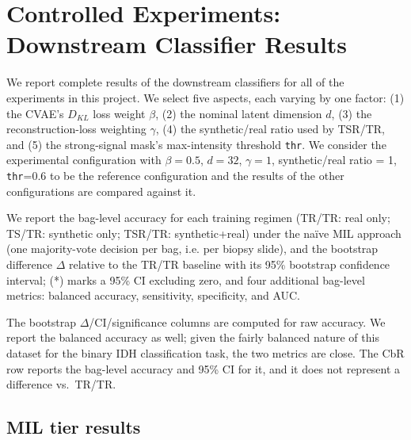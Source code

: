 \section{Controlled Experiments: Downstream Classifier Results}
\label{app:controlled_experiments}
\setcounter{table}{0}
\renewcommand{\thetable}{\Alph{section}.\arabic{table}}
\setcounter{figure}{0}
\renewcommand{\thefigure}{\Alph{section}.\arabic{figure}}

We report complete results of the downstream classifiers for all of the experiments in this project. We select five aspects, each varying by one factor: (1) the CVAE's $D_{KL}$ loss weight $\beta$, (2) the nominal latent dimension $d$, (3) the reconstruction-loss weighting $\gamma$, (4) the synthetic/real ratio used by TSR/TR, and (5) the strong-signal mask's max-intensity threshold \texttt{thr}. We consider the experimental configuration with $\beta=0.5$, $d=32$, $\gamma=1$, synthetic/real ratio = 1, \texttt{thr}=0.6 to be the reference configuration and the results of the other configurations are compared against it.

We report the bag-level accuracy for each training regimen (TR/TR: real only; TS/TR: synthetic only; TSR/TR: synthetic+real) under the naïve MIL approach (one majority-vote decision per bag, i.e. per biopsy slide), and the bootstrap difference $\Delta$ relative to the TR/TR baseline with its 95\% bootstrap confidence interval; (*) marks a 95\% CI excluding zero, and four additional bag-level metrics: balanced accuracy, sensitivity, specificity, and AUC.

The bootstrap $\Delta$/CI/significance columns are computed for raw accuracy. We report the balanced accuracy as well; given the fairly balanced nature of this dataset for the binary IDH classification task, the two metrics are close.
The CbR row reports the bag-level accuracy and 95\% CI for it, and it does not represent a difference vs.\ TR/TR.
\newpage


\subsection*{MIL tier results}\label{app:mil-results}

